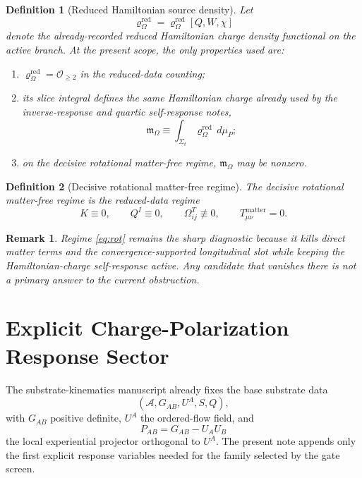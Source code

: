 \documentclass[11pt]{article}
\newcommand{\Sub}{\mathcal A}
\newcommand{\ProjSub}{P}
\newcommand{\SourceDensityRed}{\varrho_\Omega^{\mathrm{red}}}
\newcommand{\HamChargeOmega}{\mathfrak m_\Omega}
\newtheorem{definition}{Definition}
\newtheorem{remark}{Remark}
\begin{document}
\begin{definition}[Reduced Hamiltonian source density]
\label{def:rho}
Let
\begin{equation}
\SourceDensityRed
=
\SourceDensityRed[Q,W,\chi]
\label{eq:rhor}
\end{equation}
denote the already-recorded reduced Hamiltonian charge density functional on the active branch. At the present scope, the only properties used are:
\begin{enumerate}
    \item \(\SourceDensityRed=\mathcal O_{\ge 2}\) in the reduced-data counting;
    \item its slice integral defines the same Hamiltonian charge already used by the inverse-response and quartic self-response notes,
    \begin{equation}
    \HamChargeOmega
    \equiv
    \int_{\Sigma_t}\SourceDensityRed\,d\mu_P;
    \label{eq:charge}
    \end{equation}
    \item on the decisive rotational matter-free regime, \(\HamChargeOmega\) may be nonzero.
\end{enumerate}
\end{definition}

\begin{definition}[Decisive rotational matter-free regime]
\label{def:rot}
The \emph{decisive rotational matter-free regime} is the reduced-data regime
\begin{equation}
K\equiv 0,
\qquad
Q^I\equiv 0,
\qquad
\Omega_{ij}^T\not\equiv 0,
\qquad
T_{\mu\nu}^{\mathrm{matter}}=0.
\label{eq:rot}
\end{equation}
\end{definition}

\begin{remark}
Regime \eqref{eq:rot} remains the sharp diagnostic because it kills direct matter terms and the convergence-supported longitudinal slot while keeping the Hamiltonian-charge self-response active. Any candidate that vanishes there is not a primary answer to the current obstruction.
\end{remark}

\section{Explicit Charge-Polarization Response Sector}

The substrate-kinematics manuscript already fixes the base substrate data
\[
(\Sub,G_{AB},U^A,S,Q),
\]
with \(G_{AB}\) positive definite, \(U^A\) the ordered-flow field, and
\begin{equation}
\ProjSub_{AB}=G_{AB}-U_AU_B
\label{eq:projector}
\end{equation}
the local experiential projector orthogonal to \(U^A\). The present note appends only the first explicit response variables needed for the family selected by the gate screen.
\end{document}
